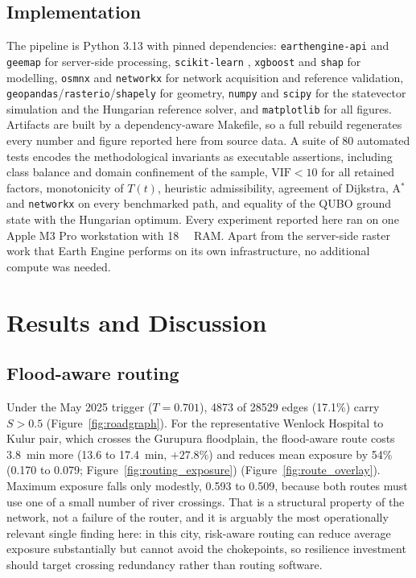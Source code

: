 \documentclass[journal]{IEEEtran}
\newcommand{\Tt}{T(t)}
\begin{document}
\subsection{Implementation}
The pipeline is Python 3.13 with pinned dependencies: \texttt{earthengine-api}
and \texttt{geemap} for server-side processing, \texttt{scikit-learn}
\citep{pedregosa2011}, \texttt{xgboost} \citep{chen2016} and \texttt{shap}
\citep{lundberg2017} for modelling, \texttt{osmnx} \citep{boeing2017} and
\texttt{networkx} for network acquisition and reference validation,
\texttt{geopandas}/\texttt{rasterio}/\texttt{shapely} for geometry,
\texttt{numpy} \citep{harris2020} and \texttt{scipy} \citep{virtanen2020} for the
statevector simulation and the Hungarian reference solver, and
\texttt{matplotlib} \citep{hunter2007} for all figures. Artifacts are built
by a dependency-aware Makefile, so a full rebuild regenerates every number and
figure reported here from source data. A suite of 80 automated tests encodes the
methodological invariants as executable assertions, including class balance and
domain confinement of the sample, $\mathrm{VIF}<10$ for all retained factors,
monotonicity of $\Tt$, heuristic admissibility, agreement of Dijkstra, A$^\ast$
and \texttt{networkx} on every benchmarked path, and equality of the QUBO ground
state with the Hungarian optimum. Every experiment reported here ran on one Apple
M3 Pro workstation with \SI{18}{\giga\byte} RAM. Apart from the server-side
raster work that Earth Engine performs on its own infrastructure, no additional
compute was needed.

\section{Results and Discussion}
\subsection{Flood-aware routing}
\label{sec:res-routing}

Under the May 2025 trigger ($T=0.701$), \num{4873} of \num{28529} edges (17.1\%)
carry $S>0.5$ (Figure~\ref{fig:roadgraph}). For the representative
Wenlock Hospital to Kulur pair, which crosses the Gurupura floodplain, the
flood-aware route costs \SI{3.8}{\minute} more (\SI{13.6}{} to
\SI{17.4}{\minute}, $+27.8\%$) and reduces mean exposure by 54\% (0.170 to 0.079;
Figure~\ref{fig:routing_exposure})
(Figure~\ref{fig:route_overlay}). Maximum exposure falls only modestly, 0.593 to
0.509, because both routes must use one of a small number of river crossings.
That is a structural property of the network, not a failure of the router,
and it is arguably the most operationally relevant single finding here: in this
city, risk-aware routing can reduce average exposure substantially but cannot
avoid the chokepoints, so resilience investment should target crossing redundancy
rather than routing software.
\end{document}
